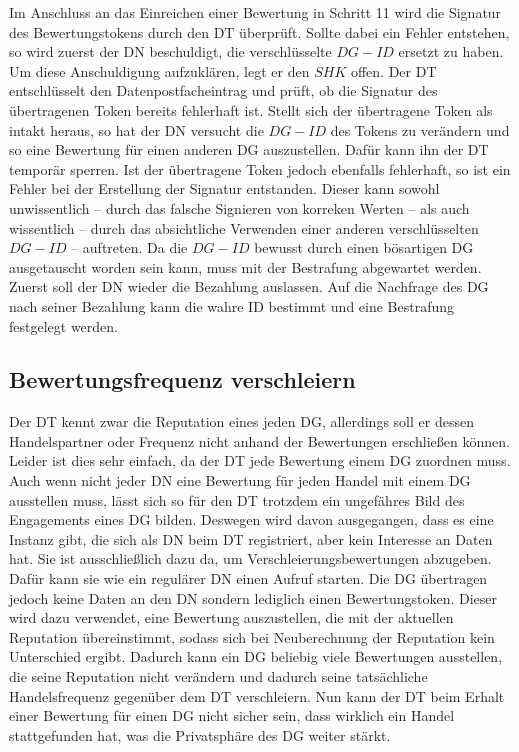 \documentclass[
	fontsize=11pt,
	headings=small,
	parskip=half,           %
	bibliography=totoc,
	numbers=noenddot,       %
	open=any,               %
]{scrreprt}
\begin{document}
\begin{enumerate}
    Im Anschluss an das Einreichen einer Bewertung in Schritt 11 wird die Signatur des Bewertungstokens durch den DT überprüft. Sollte dabei ein Fehler entstehen, so wird zuerst der DN beschuldigt, die verschlüsselte $DG-ID$ ersetzt zu haben. Um diese Anschuldigung aufzuklären, legt er den $SHK$ offen. Der DT entschlüsselt den Datenpostfacheintrag und prüft, ob die Signatur des übertragenen Token bereits fehlerhaft ist. Stellt sich der übertragene Token als intakt heraus, so hat der DN versucht die $DG-ID$ des Tokens zu verändern und so eine Bewertung für einen anderen DG auszustellen. Dafür kann ihn der DT temporär sperren. Ist der übertragene Token jedoch ebenfalls fehlerhaft, so ist ein Fehler bei der Erstellung der Signatur entstanden. Dieser kann sowohl unwissentlich -- durch das falsche Signieren von korreken Werten -- als auch wissentlich -- durch das absichtliche Verwenden einer anderen verschlüsselten $DG-ID$ -- auftreten. Da die $DG-ID$ bewusst durch einen bösartigen DG ausgetauscht worden sein kann, muss mit der Bestrafung abgewartet werden. Zuerst soll der DN wieder die Bezahlung auslassen. Auf die Nachfrage des DG nach seiner Bezahlung kann die wahre ID bestimmt und eine Bestrafung festgelegt werden.
\end{enumerate}

\subsection{Bewertungsfrequenz verschleiern}
\label{sec:ratingObfuscation}
Der DT kennt zwar die Reputation eines jeden DG, allerdings soll er dessen Handelspartner oder Frequenz nicht anhand der Bewertungen erschließen können. Leider ist dies sehr einfach, da der DT jede Bewertung einem DG zuordnen muss. Auch wenn nicht jeder DN eine Bewertung für jeden Handel mit einem DG ausstellen muss, lässt sich so für den DT trotzdem ein ungefähres Bild des Engagements eines DG bilden. Deswegen wird davon ausgegangen, dass es eine Instanz gibt, die sich als DN beim DT registriert, aber kein Interesse an Daten hat. Sie ist ausschließlich dazu da, um Verschleierungsbewertungen abzugeben. Dafür kann sie wie ein regulärer DN einen Aufruf starten. Die DG übertragen jedoch keine Daten an den DN sondern lediglich einen Bewertungstoken. Dieser wird dazu verwendet, eine Bewertung auszustellen, die mit der aktuellen Reputation übereinstimmt, sodass sich bei Neuberechnung der Reputation kein Unterschied ergibt. Dadurch kann ein DG beliebig viele Bewertungen ausstellen, die seine Reputation nicht verändern und dadurch seine tatsächliche Handelsfrequenz gegenüber dem DT verschleiern. Nun kann der DT beim Erhalt einer Bewertung für einen DG nicht sicher sein, dass wirklich ein Handel stattgefunden hat, was die Privatsphäre des DG weiter stärkt.\\
\end{document}
